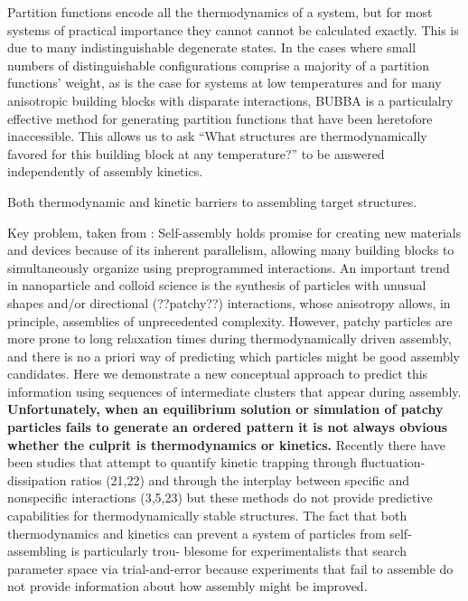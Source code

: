 Partition functions encode all the thermodynamics of a system, but for most systems of practical importance they cannot cannot be calculated exactly.
This is due to many indistinguishable degenerate states. 
In the cases where small numbers of distinguishable configurations comprise a majority of a partition functions' weight, as is the case for systems at low temperatures and for many anisotropic building blocks with disparate interactions, BUBBA is a particulalry effective method for generating partition functions that have been heretofore inaccessible. 
This allows us to ask ``What structures are thermodynamically favored for this building block at any temperature?'' to be answered independently of assembly kinetics. \cite{Jankowski_2011_JPhysChemB}


Both thermodynamic and kinetic barriers to assembling target structures.

Key problem, taken from \cite{Jankowski_2012_SoftMatter}:
Self-assembly holds promise for creating new materials and devices because of its inherent parallelism, allowing many building blocks to simultaneously organize using preprogrammed interactions.
An important trend in nanoparticle and colloid science is the synthesis of particles with unusual shapes and/or directional (??patchy??) interactions, whose anisotropy allows, in principle, assemblies of unprecedented complexity.
However, patchy particles are more prone to long relaxation times during thermodynamically driven assembly, and there is no a priori way of predicting which particles might be good assembly candidates. 
Here we demonstrate a new conceptual approach to predict this information using sequences of intermediate clusters that appear during assembly.
\textbf{Unfortunately, when an equilibrium solution or simulation of patchy particles fails to generate an ordered pattern it is not always obvious whether the culprit is thermodynamics or kinetics.}
Recently there have been studies that attempt to quantify kinetic trapping through fluctuation-dissipation ratios (21,22) and through the interplay between specific and nonspecific interactions (3,5,23) but these methods do not provide predictive capabilities for thermodynamically stable structures.
The fact that both thermodynamics and kinetics can prevent a system of particles from self-assembling is particularly trou- blesome for experimentalists that search parameter space via trial-and-error because experiments that fail to assemble do not provide information about how assembly might be improved.


